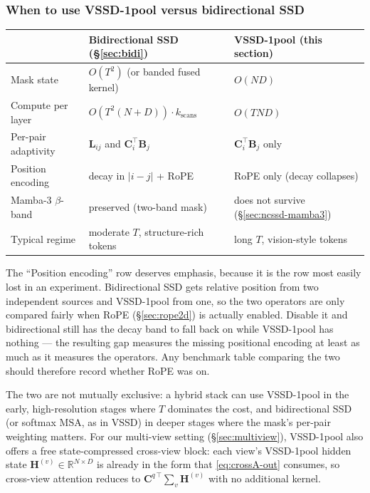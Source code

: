 \documentclass[11pt,a4paper]{article}
\begin{document}
\subsubsection{When to use VSSD-1pool versus bidirectional SSD}
\label{sec:ncssd-when}

\begin{center}
\begin{tabular}{|l|l|l|}
\hline
 & \textbf{Bidirectional SSD} (\S\ref{sec:bidi}) & \textbf{VSSD-1pool} (this section)\\ \hline
Mask state         & $O(T^2)$ (or banded fused kernel) & $O(ND)$ \\ \hline
Compute per layer  & $O(T^2(N+D))\cdot k_{\text{scans}}$ & $O(TND)$ \\ \hline
Per-pair adaptivity & $\bm{L}_{ij}$ and $\bm{C}_i^\top\bm{B}_j$ & $\bm{C}_i^\top\bm{B}_j$ only \\ \hline
Position encoding   & decay in $|i-j|$ + RoPE   & RoPE only (decay collapses) \\ \hline
Mamba-3 $\beta$-band & preserved (two-band mask) & does not survive (\S\ref{sec:ncssd-mamba3}) \\ \hline
Typical regime      & moderate $T$, structure-rich tokens & long $T$, vision-style tokens \\ \hline
\end{tabular}
\end{center}
The ``Position encoding'' row deserves emphasis, because it is the row most
easily lost in an experiment. Bidirectional SSD gets relative position from two
independent sources and VSSD-1pool from one, so the two operators are only compared
fairly when RoPE (\S\ref{sec:rope2d}) is actually enabled. Disable it and
bidirectional still has the decay band to fall back on while VSSD-1pool has nothing
--- the resulting gap measures the missing positional encoding at least as much
as it measures the operators. Any benchmark table comparing the two should
therefore record whether RoPE was on.

The two are not mutually exclusive: a hybrid stack can use VSSD-1pool in
the early, high-resolution stages where $T$ dominates the cost, and
bidirectional SSD (or softmax MSA, as in VSSD) in deeper stages where
the mask's per-pair weighting matters. For our multi-view setting
(\S\ref{sec:multiview}), VSSD-1pool also offers a free state-compressed
cross-view block: each view's VSSD-1pool hidden state
$\bm{H}^{(v)}\in\mathbb{R}^{N\times D}$ is already in the form that
\eqref{eq:crossA-out} consumes, so cross-view attention reduces to
$\bm{C}^{q\,\top}\sum_v \bm{H}^{(v)}$ with no additional kernel.
\end{document}
